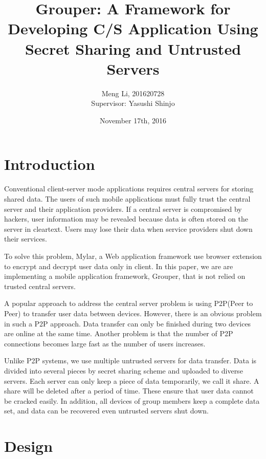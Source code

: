 \documentclass[twocolumn,10pt]{article}
\begin{document}
\date{November 17th, 2016}

\title{\bf Grouper: A Framework for Developing C/S Application Using Secret Sharing and Untrusted Servers}

\author{
	Meng Li, 201620728  
	\\ Supervisor: Yasushi Shinjo
}

\maketitle

\section{Introduction}
Conventional client-server mode applications requires central servers for storing shared data. The users of such mobile applications must fully trust the central server and their application providers. If a central server is compromised by hackers, user information may be revealed because data is often stored on the server in cleartext. Users may lose their data when service providers shut down their services. 

To solve this problem, Mylar\cite{popa2014building}, a Web application framework use browser extension to encrypt and decrypt user data only in client. In this paper, we are are implementing a mobile application framework, Grouper, that is not relied on trusted central servers.

A popular approach to address the central server problem is using P2P(Peer to Peer) to transfer user data between devices. However, there is an obvious problem in such a P2P approach. Data transfer can only be finished during two devices are online at the same time. Another problem is that the number of P2P connections becomes large  fast as the number of users increases. 

Unlike P2P systems, we use multiple untrusted servers for data transfer. Data is divided into several pieces by secret sharing scheme and uploaded to diverse servers. Each server can only keep a piece of data temporarily, we call it share. A share will be deleted after a period of time. These ensure that user data cannot be cracked easily. In addition, all devices of group members keep a complete data set, and data can be recovered even untrusted servers shut down.

\section{Design}
\end{document}
